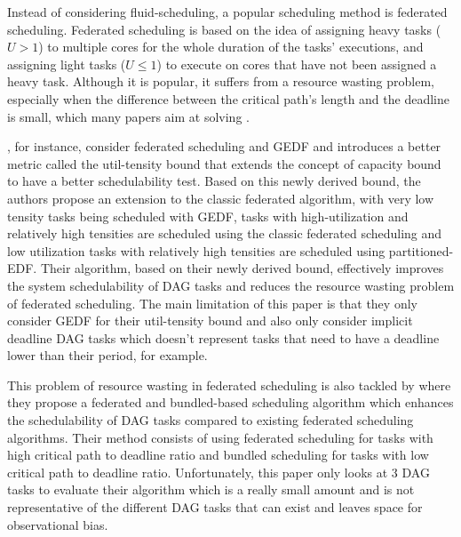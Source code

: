 Instead of considering fluid-scheduling,
a popular scheduling method is federated scheduling.
Federated scheduling is based on the idea
of assigning heavy tasks ($U > 1$) to multiple cores
for the whole duration of the tasks' executions,
and assigning light tasks ($U \le 1$) to execute on
cores that have not been assigned a heavy task.
Although it is popular, it suffers from a resource wasting problem,
especially when the difference between the critical path's length 
and the deadline is small,
which many papers aim at solving
\cite{Guan2023FederatedNew}
\cite{jiangUtilTensityBound}
\cite{JiangVirtuallyFederatedSched2021}
\cite{Jiang2023SchedVirtualProcs}
\cite{Kobayashi2023FedBundledDagsched}
\cite{He2023DegreeOfParallelism}.

\citet{jiangUtilTensityBound}, for instance, 
consider federated scheduling and GEDF
and introduces a better metric called the util-tensity bound
that extends the concept of capacity bound
to have a better schedulability test.
Based on this newly derived bound, the authors 
propose an extension to the classic federated algorithm,
with very low tensity tasks being scheduled with GEDF, 
tasks with high-utilization and relatively high tensities are scheduled
using the classic federated scheduling and low utilization
tasks with relatively high tensities are scheduled using partitioned-EDF.
Their algorithm, based on their newly derived bound, effectively improves
the system schedulability of DAG tasks and reduces the resource wasting 
problem of federated scheduling. The main limitation
of this paper is that they only consider GEDF 
for their util-tensity bound and also only consider implicit deadline DAG tasks
which doesn't represent tasks that need to have a deadline 
lower than their period, for example.

This problem of resource wasting in federated scheduling
is also tackled by \citet{Kobayashi2023FedBundledDagsched}
where they propose a federated and bundled-based scheduling
algorithm which enhances the schedulability of DAG tasks
compared to existing federated scheduling algorithms.
Their method consists of using federated scheduling for
tasks with high critical path to deadline ratio and bundled
scheduling for tasks with low critical path to deadline ratio.
Unfortunately, this paper only looks at 3 DAG tasks to evaluate
their algorithm which is a really small amount and is not 
representative of the different DAG tasks that can exist
and leaves space for observational bias.

